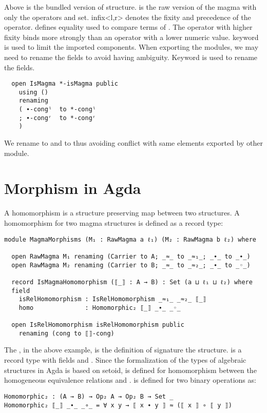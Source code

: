 Above is the bundled version of  structure.  is
the raw version of the magma with only the operators and set. infix<l,r> denotes
the fixity and precedence of the operator.  defines equality used to
compare terms of . The operator with higher fixity binds more
strongly than an operator with a lower numeric value.  keyword is
used to limit the imported components. When exporting the modules, we may need
to rename the fields to avoid having ambiguity. Keyword  is
used to rename the fields.

\label{code:rename}
\begin{verbatim}
  open IsMagma *-isMagma public
    using ()
    renaming
    ( ∙-congˡ  to *-congˡ
    ; ∙-congʳ  to *-congʳ
    )
\end{verbatim} 

We rename   to  and   to
 thus avoiding conflict with same elements exported by other
module.

\section{Morphism in Agda}
A homomorphism is a structure preserving map between two structures. A
homomorphism for two magma structures is defined as a record type:
\begin{verbatim}
module MagmaMorphisms (M₁ : RawMagma a ℓ₁) (M₂ : RawMagma b ℓ₂) where

  open RawMagma M₁ renaming (Carrier to A; _≈_ to _≈₁_; _∙_ to _∙_)
  open RawMagma M₂ renaming (Carrier to B; _≈_ to _≈₂_; _∙_ to _◦_)

  record IsMagmaHomomorphism (⟦_⟧ : A → B) : Set (a ⊔ ℓ₁ ⊔ ℓ₂) where
  field
    isRelHomomorphism : IsRelHomomorphism _≈₁_ _≈₂_ ⟦_⟧
    homo              : Homomorphic₂ ⟦_⟧ _∙_ _◦_

  open IsRelHomomorphism isRelHomomorphism public
    renaming (cong to ⟦⟧-cong)
\end{verbatim}

The , in the above example,  is the
definition of signature the structure.  is a record
type with fields  and . Since the
formalization of the types of algebraic structures in Agda is based on setoid,
 is defined for homomorphism between the homogeneous
equivalence relations  and .  is
defined for two binary operations as:
\begin{verbatim}
Homomorphic₂ : (A → B) → Op₂ A → Op₂ B → Set _
Homomorphic₂ ⟦_⟧ _∙_ _∘_ = ∀ x y → ⟦ x ∙ y ⟧ ≈ (⟦ x ⟧ ∘ ⟦ y ⟧)
\end{verbatim}

